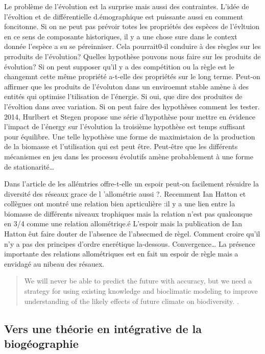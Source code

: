 Le problème de l'évolution est la surprise mais aussi des contraintes.
L'idée de l'évoltion et de différentielle d.émographique est puissante
aussi en comment foncitonne. Si on ne peut pas prévoir totes les
propriétés des espèces de l'évltuion en ce sens de composante
historiques, il y a une chose sure dans le context donnée l'espèce a su
se péreinniser. Cela pourrait0-il conduire à des rèsgles sur les
prroduits de l'évolution? Quelles hypothèse pouvons nous faire sur les
produits de évolution? Si on peut supposer qu'il y a des compétition ou
la règle est le changemnt cette même propriété a-t-elle des propriétés
sur le long terme. Peut-on affirmer que les produits de l'évoluton dans
un enviroemnt stable amène à des entités qui optimise l'tilisation de
l'énergie. Si oui, que dire des produites de l'évoltion dans avec
variation. Si on peut faire des hypothèses comment les tester. 2014,
Hurlbert et Stegen propose une série d'hypothèse pour mettre en évidence
l'impact de l'énergy sur l'évolution la troisième hypothèse est temps
suffisant pour équilibre. Une telle hypothèse une forme de maximistaion
de la production de la biomasse et l'utilisation qui est peut être.
Peut-être que les différents mécanismes en jeu dans les processu
évolutifs amène probablement à une forme de stationarité\ldots{}

Dans l'article de \citep{Rabosky2015} les allémtries offre-t-elle un
espoir peut-on facilement résuidre la diversité des réseaux
\citep{Eklof2013} grace de l 'allométrie aussi \citep{Schneider2012}?.
Recemment Ian Hatton et collègues ont montré une relation bien
aprticulière :il y a une lien entre la biomasse de différents niveaux
trophiques mais la relation n'est pas qualconque en 3/4 comme une
relation allométriqe.é L'espoir mais la publication de Ian Hatton êut
faire douter de l'absence de l'absecmed de règel. Comment croire qu'il
n'y a pas des principes d'ordre enerétique la-dessous.
Convergence\ldots{} La présence importante des relations allométriques
est en fait un espoir de règle mais a envidagé au nibeau des résauex.

\begin{quote}
We will never be able to predict the future with accuracy, but we need a
strategy for using existing knowledge and bioclimatic modeling to
improve understanding of the likely effects of future climate on
biodiversity. \citep{Araujo2006}.
\end{quote}

\subsection*{Vers une théorie en intégrative de la
biogéographie}\label{vers-une-thuxe9orie-en-intuxe9grative-de-la-bioguxe9ographie}


